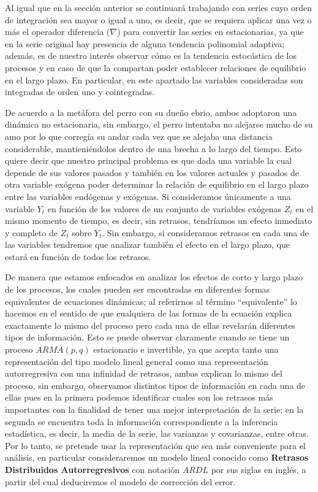 Al igual que en la sección anterior se continuará trabajando con series cuyo orden de integración sea mayor o igual a uno, es decir, que se requiera aplicar una vez o más el operador diferencia ($\nabla$) para convertir las series en estacionarias, ya que en la serie original hay presencia de alguna tendencia polinomial adaptiva; además, es de nuestro interés  observar cómo es la tendencia estocástica de los procesos y en caso de que la compartan poder establecer relaciones de equilibrio en el largo plazo. En particular, en este apartado las variables consideradas son integradas de orden uno y cointegradas.  \bigskip


De acuerdo a la metáfora del perro con su due\~no ebrio, ambos adoptaron una dinámica no estacionaria, sin embargo, el perro intentaba no alejarse mucho de su amo por lo que corregía su andar cada vez que se alejaba una distancia considerable, mantieniéndolos dentro de una brecha a lo largo del tiempo.  Esto quiere decir que nuestro principal problema es que dada una variable la cual depende de sus valores pasados y también en los valores actuales y pasados de otra variable exógena poder determinar la relación de equilibrio en el largo plazo entre las variables endógenas y exógenas.  Si  consideramos únicamente a una variable $Y_t$ en función de los valores de un conjunto de variables exógenas $Z_t$ en el mismo momento de tiempo, es decir, sin retrasos, tendríamos un efecto inmediato y completo de $Z_t$ sobre $Y_t$. Sin embargo, si consideramos retrasos en cada una de las variables tendremos que analizar también el efecto en el largo plazo, que estará en función de todos los retrasos.\bigskip


De manera que estamos enfocados en analizar los efectos de corto y largo plazo de los procesos, los cuales pueden ser encontradas en diferentes formas equivalentes de ecuaciones dinámicas; al referirnos al término ``equivalente'' lo hacemos en el sentido de que cualquiera de las formas de la ecuación explica exactamente lo mismo del proceso pero cada una de ellas revelarán diferentes tipos de información. Esto se puede observar claramente cuando se tiene un proceso $ARMA(p,q)$ estacionario e invertible, ya que acepta tanto una representación del tipo modelo lineal general como una representación autorregresiva con una infinidad de retrasos, ambas explican lo mismo del proceso, sin embargo, observamos distintos tipos de información en cada una de ellas pues en la primera podemos identificar cuales son los retrasos más importantes con la finalidad de tener una mejor interpretación de la serie; en la segunda se encuentra toda la información correspondiente a la inferencia estadística, es decir, la media de la serie, las varianzas y covarianzas, entre otras. Por lo tanto, se pretende usar la representación que sea más conveniente para el análisis, en particular consideraremos un modelo lineal conocido como \textbf{Retrasos Distribuidos Autorregresivos} con notación $ARDL$ por sus siglas en inglés, a partir del cual deduciremos el modelo de corrección del error. \bigskip

